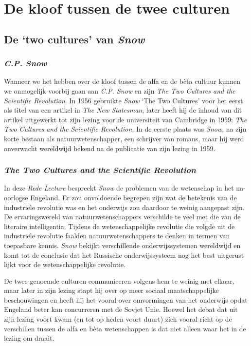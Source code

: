 \chapter{De kloof tussen de twee culturen}


\section{De `two cultures' van \emph{Snow}}


\subsection{\emph{C.P. Snow}}

Wanneer we het hebben over de kloof tussen de alfa en de b\`eta cultuur kunnen we onmogelijk voorbij gaan aan \emph{C.P. Snow} en zijn \emph{The Two Cultures and the Scientific Revolution}\cite{Snow}. In 1956 gebruikte \emph{Snow} `The Two Cultures' voor het eerst als titel van een artikel in \emph{The New Statesman}, later heeft hij de inhoud van dit artikel uitgewerkt tot zijn lezing voor de universiteit van Cambridge in 1959: \emph{The Two Cultures and the Scientific Revolution}. In de eerste plaats was \emph{Snow}, na zijn korte bestaan als natuurwetenschapper, een schrijver van romans, maar hij werd onverwacht wereldwijd bekend na de publicatie van zijn lezing in 1959.


\subsection{\emph{The Two Cultures and the Scientific Revolution}}

In deze \emph{Rede Lecture} bespreekt \emph{Snow} de problemen van de wetenschap in het na-oorlogse Engeland. Er zou onvoldoende begrepen zijn wat de betekenis van de industri\"ele revolutie was en het onderwijs zou daardoor te weinig aangepast zijn. De ervaringswereld van natuurwetenschappers verschilde te veel met die van de literaire intelligentia. Tijdens de wetenschappelijke revolutie die volgde uit de industri\"ele revolutie faalden natuurwetenschappers te denken in termen van toepasbare kennis. \emph{Snow} bekijkt verschillende onderwijssystemen wereldwijd en komt tot de conclusie dat het Russische onderwijssysteem nog het best uitgerust lijkt voor de wetenschappelijke revolutie.

De twee genoemde culturen communiceren volgens hem te weinig met elkaar, maar later in zijn lezing stapt hij over op meer sociaal maatschappelijke beschouwingen en heeft hij het vooral over omvormingen van het onderwijs opdat Engeland beter kan concurreren met de Sovjet Unie. Hoewel het debat dat uit zijn lezing voort kwam (en tot op heden voort duurt) zich vooral richt op de verschillen tussen de alfa en b\`eta wetenschappen is dat niet alleen waar het in de lezing om draait.


